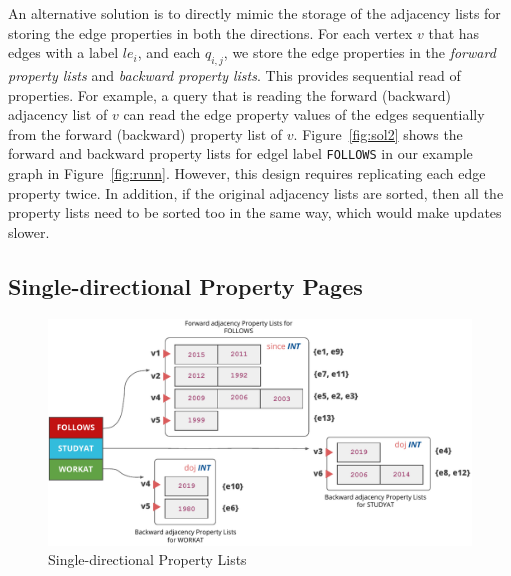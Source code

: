  An alternative solution is to directly mimic the storage of the adjacency lists for storing the edge properties in both the directions. For each vertex $v$ that has edges with a label $le_i$, and each $q_{i,j}$, we store the edge properties in the \emph{forward property lists} and \emph{backward property lists}. This provides sequential read of properties. For example, a query that is reading the forward (backward) adjacency list of $v$ can read the edge property values of the edges sequentially from the forward (backward) property list of $v$. Figure~\ref{fig:sol2} shows the forward and backward property lists for edgel label \texttt{FOLLOWS} in our example graph in Figure~\ref{fig:runn}. However, this design requires replicating each edge property twice. In addition, if the original adjacency lists are sorted, then all the property lists need to be sorted too in the same way, which would make updates slower. 

\subsection{Single-directional Property Pages}
\label{sec:single-directional-property-pages}

\begin{figure}
	\hfill\includegraphics[scale=0.78]{img/single-dir-prop-list}\hspace*{\fill}
	\captionsetup{justification=centering}
	\caption{Single-directional Property Lists}
	\label{fig:single-dir-prop-list}
\end{figure}

